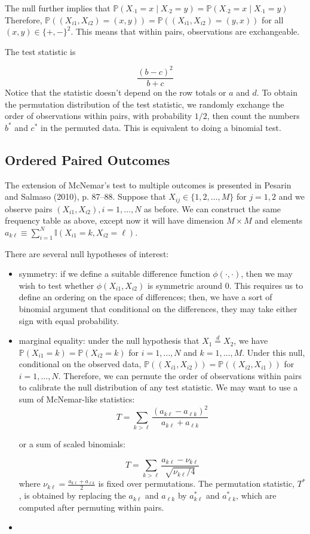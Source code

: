\documentclass[12pt]{article}
\newcommand{\todo}[1]{{\color{red}{TO DO: \sc #1}}}
\newcommand{\ind}{\mathbb{I}} %
\newcommand{\pr}{\mathbb{P}} %
\newcommand{\eqd}{\stackrel{d}{=}} %
\begin{document}
The null further implies that $\pr(X_{\cdot 1} = x \mid X_{\cdot 2} = y) = \pr(X_{\cdot 2} = x \mid X_{\cdot 1} = y)$
Therefore, $\pr((X_{i1}, X_{i2}) = (x, y)) = \pr((X_{i1}, X_{i2}) = (y, x))$ for all $(x, y) \in \{ +, - \}^2$.
This means that within pairs, observations are exchangeable.


The test statistic is

$$\frac{(b-c)^2}{b+c}$$
Notice that the statistic doesn't depend on the row totals or $a$ and $d$.
To obtain the permutation distribution of the test statistic, we randomly exchange the order of observations within pairs, with probability $1/2$, then count the numbers $b^*$ and $c^*$ in the permuted data.
This is equivalent to doing a binomial test.

\subsection{Ordered Paired Outcomes}
The extension of McNemar's test to multiple outcomes is presented in Pesarin and Salmaso (2010), p. 87--88.
Suppose that $X_{ij} \in \{1, 2, \dots, M\}$ for $j=1, 2$ and we observe pairs $(X_{i1}, X_{i2}), i=1,\dots,N$ as before.
We can construct the same frequency table as above, except now it will have dimension $M \times M$ and elements $a_{k\ell} \equiv \sum_{i=1}^N \ind{(X_{i1} = k, X_{i2} = \ell)}$.

There are several null hypotheses of interest:
\begin{itemize}
\item symmetry: if we define a suitable difference function $\phi(\cdot, \cdot)$, then we may wish to test whether $\phi(X_{i1}, X_{i2})$ is symmetric around 0.
This requires us to define an ordering on the space of differences;
then, we have a sort of binomial argument that conditional on the differences, they may take either sign with equal probability.
\todo{flesh out}
\item marginal equality: under the null hypothesis that $X_1 \eqd X_2$, we have $\pr(X_{i1} = k) = \pr(X_{i2} = k)$ for $i = 1, \dots, N$ and $k = 1, \dots, M$.
Under this null, conditional on the observed data, $\pr( (X_{i1}, X_{i2})) = \pr((X_{i2}, X_{i1}))$ for $i=1,\dots, N$.
Therefore, we can permute the order of observations within pairs to calibrate the null distribution of any test statistic.
We may want to use a sum of McNemar-like statistics:
$$T = \sum_{k > \ell} \frac{(a_{k \ell} - a_{\ell k})^2}{a_{k \ell} + a_{\ell k}}$$

or a sum of scaled binomials:

$$T = \sum_{k > \ell} \frac{ a_{k \ell} - \nu_{k \ell}}{\sqrt{\nu_{k \ell}/4}}$$
where $\nu_{k \ell} = \frac{a_{k \ell} + a_{\ell k}}{2}$ is fixed over permutations.
The permutation statistic, $T^*$, is obtained by replacing the $a_{k \ell}$ and $a_{\ell k}$ by $a_{k \ell}^*$ and $a_{\ell k}^*$, which are computed after permuting within pairs.
\item \todo{test statistic from Stuart (1955) paper}
\end{itemize}
\end{document}

